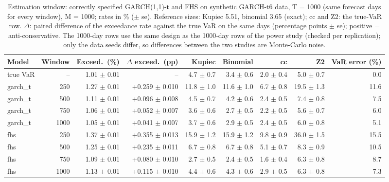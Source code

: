 \begin{table}[H]
\centering
\scriptsize
\caption{Estimation window: correctly specified GARCH(1,1)-t and FHS on synthetic GARCH-t6 data, T = 1000 (same forecast days for every window), M = 1000; rates in \% ($\pm$ se). Reference sizes: Kupiec 5.51, binomial 3.65 (exact); cc and Z2: the true-VaR row. $\Delta$: paired difference of the exceedance rate against the true VaR on the same days (percentage points $\pm$ se); positive = anti-conservative. The 1000-day rows use the same design as the 1000-day rows of the power study (checked per replication); only the data seeds differ, so differences between the two studies are Monte-Carlo noise.}
\label{tab:T4_estimation_window}
\setlength{\tabcolsep}{3.5pt}
\begin{tabular}{lrrrrrrrr}
\toprule
Model & Window & Exceed.\ (\%) & $\Delta$ exceed.\ (pp) & Kupiec & Binomial & cc & Z2 & VaR error (\%) \\
\midrule
true VaR & -- & 1.01 $\pm$ 0.01 & -- & 4.7 $\pm$ 0.7 & 3.4 $\pm$ 0.6 & 2.0 $\pm$ 0.4 & 5.0 $\pm$ 0.7 & 0.0 \\
garch\_t & 250 & 1.27 $\pm$ 0.01 & +0.259 $\pm$ 0.010 & 11.8 $\pm$ 1.0 & 11.6 $\pm$ 1.0 & 6.7 $\pm$ 0.8 & 19.5 $\pm$ 1.3 & 11.6 \\
garch\_t & 500 & 1.11 $\pm$ 0.01 & +0.096 $\pm$ 0.008 & 4.5 $\pm$ 0.7 & 4.2 $\pm$ 0.6 & 2.4 $\pm$ 0.5 & 7.4 $\pm$ 0.8 & 7.5 \\
garch\_t & 750 & 1.06 $\pm$ 0.01 & +0.052 $\pm$ 0.007 & 3.6 $\pm$ 0.6 & 2.7 $\pm$ 0.5 & 2.2 $\pm$ 0.5 & 5.6 $\pm$ 0.7 & 6.0 \\
garch\_t & 1000 & 1.05 $\pm$ 0.01 & +0.041 $\pm$ 0.007 & 3.7 $\pm$ 0.6 & 2.9 $\pm$ 0.5 & 2.4 $\pm$ 0.5 & 6.0 $\pm$ 0.8 & 5.1 \\
fhs & 250 & 1.37 $\pm$ 0.01 & +0.355 $\pm$ 0.013 & 15.9 $\pm$ 1.2 & 15.9 $\pm$ 1.2 & 9.8 $\pm$ 0.9 & 36.0 $\pm$ 1.5 & 15.5 \\
fhs & 500 & 1.25 $\pm$ 0.01 & +0.235 $\pm$ 0.011 & 6.7 $\pm$ 0.8 & 6.7 $\pm$ 0.8 & 5.1 $\pm$ 0.7 & 8.3 $\pm$ 0.9 & 10.5 \\
fhs & 750 & 1.09 $\pm$ 0.01 & +0.080 $\pm$ 0.010 & 2.7 $\pm$ 0.5 & 2.4 $\pm$ 0.5 & 1.6 $\pm$ 0.4 & 6.3 $\pm$ 0.8 & 8.7 \\
fhs & 1000 & 1.13 $\pm$ 0.01 & +0.115 $\pm$ 0.010 & 4.4 $\pm$ 0.6 & 4.3 $\pm$ 0.6 & 2.9 $\pm$ 0.5 & 6.3 $\pm$ 0.8 & 7.3 \\
\bottomrule
\end{tabular}
\end{table}
